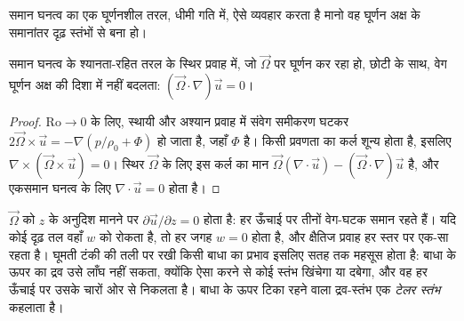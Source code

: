 समान घनत्व का एक घूर्णनशील तरल, धीमी गति में, ऐसे व्यवहार करता है मानो वह
घूर्णन अक्ष के समानांतर दृढ़ स्तंभों से बना हो।

\begin{theorem}[टेलर--प्राउडमैन]\label{thm:b3:gfd-foundations:taylor-proudman}
समान घनत्व के श्यानता-रहित तरल के स्थिर प्रवाह में, जो
$\vec\Omega$ पर घूर्णन कर रहा हो, छोटी  के साथ, वेग
घूर्णन अक्ष की दिशा में नहीं बदलता: $(\vec\Omega\cdot\nabla)\vec u = 0$।
\end{theorem}

\begin{proof}
$\mathrm{Ro}\to 0$ के लिए, स्थायी और अश्यान प्रवाह में संवेग समीकरण घटकर
$2\vec\Omega\times\vec u = -\nabla(p/\rho_0 + \Phi)$ हो जाता है, जहाँ $\Phi$  है।
किसी प्रवणता का कर्ल शून्य होता है, इसलिए $\nabla\times(\vec\Omega
\times\vec u) = 0$। स्थिर $\vec\Omega$ के लिए इस कर्ल का मान $\vec\Omega
(\nabla\cdot\vec u) - (\vec\Omega\cdot\nabla)\vec u$ है, और एकसमान घनत्व के लिए $\nabla\cdot\vec u
= 0$ होता है।
\end{proof}

$\vec\Omega$ को $z$ के अनुदिश मानने पर $\partial\vec u/\partial z = 0$ होता है: हर ऊँचाई पर तीनों
वेग-घटक समान रहते हैं। यदि कोई दृढ़ तल वहाँ $w$ को रोकता है,
तो हर जगह $w = 0$ होता है, और क्षैतिज प्रवाह हर स्तर पर एक-सा रहता है।
घूमती टंकी की तली पर रखी किसी बाधा का प्रभाव इसलिए सतह तक महसूस होता है:
बाधा के ऊपर का द्रव उसे लाँघ नहीं सकता, क्योंकि ऐसा करने
से कोई स्तंभ खिंचेगा या दबेगा, और वह हर ऊँचाई पर उसके चारों ओर से निकलता है।
बाधा के ऊपर टिका रहने वाला द्रव-स्तंभ एक \emph{टेलर
स्तंभ} कहलाता है।

